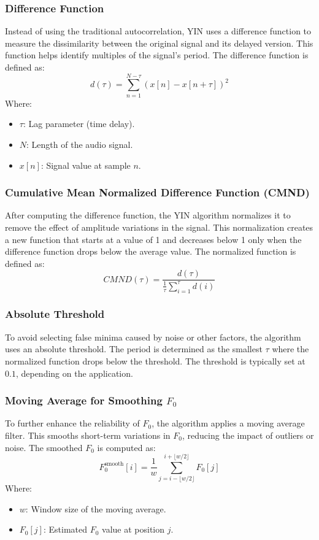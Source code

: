 \documentclass{ieeeaccess}
\begin{document}
\subsubsection{Difference Function}
Instead of using the traditional autocorrelation, YIN uses a difference function to measure the dissimilarity between the original signal and its delayed version. This function helps identify multiples of the signal's period.
The difference function is defined as:
\begin{equation}
d(\tau) = \sum_{n=1}^{N-\tau} \left( x[n] - x[n+\tau] \right)^2
\end{equation}
Where:
\begin{itemize}
    \item \( \tau \): Lag parameter (time delay).
    \item \( N \): Length of the audio signal.
    \item \( x[n] \): Signal value at sample \( n \).
\end{itemize}

\subsubsection{Cumulative Mean Normalized Difference Function (CMND)}
After computing the difference function, the YIN algorithm normalizes it to remove the effect of amplitude variations in the signal. This normalization creates a new function that starts at a value of 1 and decreases below 1 only when the difference function drops below the average value.
The normalized function is defined as:
\begin{equation}
CMND(\tau) = \frac{d(\tau)}{\frac{1}{\tau} \sum_{i=1}^{\tau} d(i)}
\end{equation}

\subsubsection{Absolute Threshold}
To avoid selecting false minima caused by noise or other factors, the algorithm uses an absolute threshold. The period is determined as the smallest \( \tau \) where the normalized function drops below the threshold.
The threshold is typically set at \( 0.1 \), depending on the application.

\subsubsection{Moving Average for Smoothing \( F_0 \)}
To further enhance the reliability of \( F_0 \), the algorithm applies a moving average filter. This smooths short-term variations in \( F_0 \), reducing the impact of outliers or noise.
The smoothed \( F_0 \) is computed as:
\begin{equation}
F_0^{\text{smooth}}[i] = \frac{1}{w} \sum_{j=i-\lfloor w/2 \rfloor}^{i+\lfloor w/2 \rfloor} F_0[j]
\end{equation}
Where:
\begin{itemize}
    \item \( w \): Window size of the moving average.
    \item \( F_0[j] \): Estimated \( F_0 \) value at position \( j \).
\end{itemize}
\end{document}
